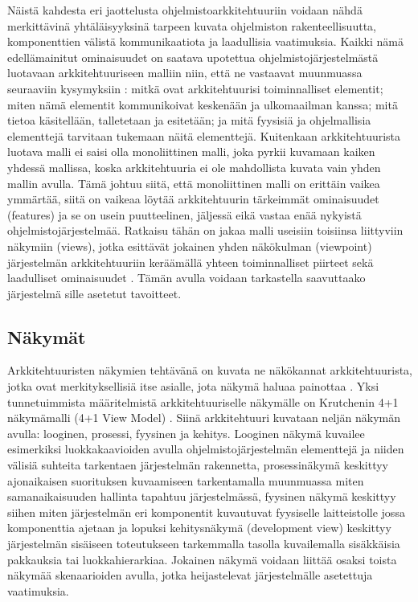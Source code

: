 \documentclass[finnish]{tktltiki2}
\theoremstyle{definition}
\theoremstyle{remark}
\begin{document}
Näistä kahdesta eri jaottelusta ohjelmistoarkkitehtuuriin voidaan nähdä merkittävinä yhtäläisyyksinä tarpeen kuvata ohjelmiston rakenteellisuutta, komponenttien välistä kommunikaatiota ja laadullisia vaatimuksia. Kaikki nämä edellämainitut ominaisuudet on saatava  upotettua ohjelmistojärjestelmästä luotavaan arkkitehtuuriseen malliin niin, että ne vastaavat muunmuassa seuraaviin kysymyksiin \citep[s. 31 - 33]{Rozanski:2011:SSA:2072649}: mitkä ovat arkkitehtuurisi toiminnalliset elementit; miten nämä elementit kommunikoivat keskenään ja ulkomaailman kanssa; mitä tietoa käsitellään, talletetaan ja esitetään; ja mitä fyysisiä ja ohjelmallisia elementtejä tarvitaan tukemaan näitä  elementtejä. Kuitenkaan arkkitehtuurista luotava malli ei saisi olla monoliittinen malli, joka pyrkii kuvamaan kaiken yhdessä mallissa, koska arkkitehtuuria ei ole mahdollista kuvata vain yhden mallin avulla. Tämä johtuu siitä, että monoliittinen malli on erittäin vaikea ymmärtää, siitä on vaikeaa löytää arkkitehtuurin tärkeimmät ominaisuudet (features) ja se on usein puutteelinen, jäljessä eikä vastaa enää nykyistä ohjelmistojärjestelmää. Ratkaisu tähän on jakaa malli useisiin toisiinsa liittyviin näkymiin (views), jotka esittävät jokainen yhden näkökulman (viewpoint) järjestelmän arkkitehtuuriin keräämällä yhteen toiminnalliset piirteet sekä laadulliset ominaisuudet \citetext{\citealp[s. 33-34]{Rozanski:2011:SSA:2072649}; \citealp[s. 8-9]{gorton_understanding_2011}}. Tämän avulla voidaan tarkastella saavuttaako järjestelmä sille asetetut tavoitteet.


\subsection{Näkymät}

Arkkitehtuuristen näkymien tehtävänä on kuvata ne näkökannat arkkitehtuurista, jotka ovat merkityksellisiä itse asialle, jota näkymä haluaa painottaa \cite{Rozanski:2011:SSA:2072649}. Yksi tunnetuimmista määritelmistä arkkitehtuuriselle näkymälle on Krutchenin 4+1 näkymämalli (4+1 View Model) \citep[s.7]{gorton_understanding_2011}. Siinä arkkitehtuuri kuvataan neljän näkymän avulla: looginen, prosessi, fyysinen ja kehitys. Looginen näkymä kuvailee esimerkiksi luokkakaavioiden avulla ohjelmistojärjestelmän elementtejä ja niiden välisiä suhteita tarkentaen järjestelmän rakennetta, prosessinäkymä keskittyy ajonaikaisen suorituksen kuvaamiseen tarkentamalla muunmuassa miten samanaikaisuuden hallinta tapahtuu järjestelmässä, fyysinen näkymä keskittyy siihen miten järjestelmän eri komponentit kuvautuvat fyysiselle laitteistolle jossa komponenttia ajetaan ja lopuksi kehitysnäkymä (development view) keskittyy järjestelmän sisäiseen toteutukseen tarkemmalla tasolla kuvailemalla sisäkkäisia pakkauksia tai luokkahierarkiaa. Jokainen näkymä voidaan liittää osaksi toista näkymää skenaarioiden avulla, jotka heijastelevat järjestelmälle asetettuja vaatimuksia. 
	
\end{document}
